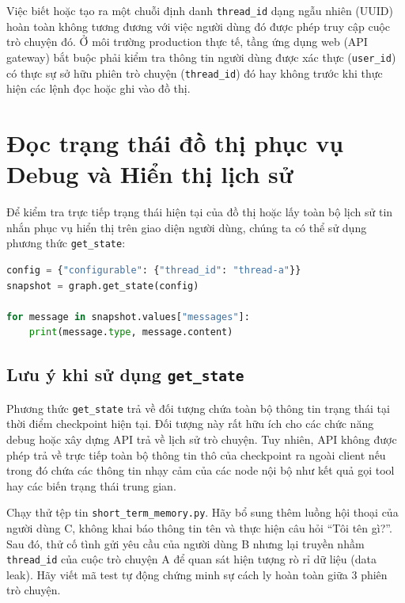 \begin{aiwarning}
Việc biết hoặc tạo ra một chuỗi định danh \texttt{thread\_id} dạng ngẫu nhiên (UUID) hoàn toàn không tương đương với việc người dùng đó được phép truy cập cuộc trò chuyện đó. Ở môi trường production thực tế, tầng ứng dụng web (API gateway) bắt buộc phải kiểm tra thông tin người dùng được xác thực (\texttt{user\_id}) có thực sự sở hữu phiên trò chuyện (\texttt{thread\_id}) đó hay không trước khi thực hiện các lệnh đọc hoặc ghi vào đồ thị.
\end{aiwarning}

\section{Đọc trạng thái đồ thị phục vụ Debug và Hiển thị lịch sử}

Để kiểm tra trực tiếp trạng thái hiện tại của đồ thị hoặc lấy toàn bộ lịch sử tin nhắn phục vụ hiển thị trên giao diện người dùng, chúng ta có thể sử dụng phương thức \texttt{get\_state}:

\begin{lstlisting}[language=Python,caption={Đọc snapshot hiện tại của thread}]
config = {"configurable": {"thread_id": "thread-a"}}
snapshot = graph.get_state(config)

for message in snapshot.values["messages"]:
    print(message.type, message.content)
\end{lstlisting}

\subsection{Lưu ý khi sử dụng \texttt{get\_state}}
Phương thức \texttt{get\_state} trả về đối tượng chứa toàn bộ thông tin trạng thái tại thời điểm checkpoint hiện tại. Đối tượng này rất hữu ích cho các chức năng debug hoặc xây dựng API trả về lịch sử trò chuyện. Tuy nhiên, API không được phép trả về trực tiếp toàn bộ thông tin thô của checkpoint ra ngoài client nếu trong đó chứa các thông tin nhạy cảm của các node nội bộ như kết quả gọi tool hay các biến trạng thái trung gian.

\begin{aicheckpoint}
Chạy thử tệp tin \texttt{short\_term\_memory.py}. Hãy bổ sung thêm luồng hội thoại của người dùng C, không khai báo thông tin tên và thực hiện câu hỏi ``Tôi tên gì?''. Sau đó, thử cố tình gửi yêu cầu của người dùng B nhưng lại truyền nhầm \texttt{thread\_id} của cuộc trò chuyện A để quan sát hiện tượng rò rỉ dữ liệu (data leak). Hãy viết mã test tự động chứng minh sự cách ly hoàn toàn giữa 3 phiên trò chuyện.
\end{aicheckpoint}
